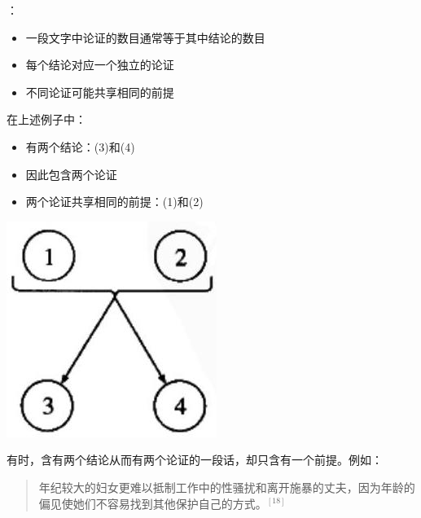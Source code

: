\begin{theorembox}[title=多重论证的识别原则]
：
\begin{itemize}
  \item 一段文字中论证的数目通常等于其中结论的数目
  \item 每个结论对应一个独立的论证
  \item 不同论证可能共享相同的前提
\end{itemize}

在上述例子中：
\begin{itemize}
  \item 有两个结论：(3)和(4)
  \item 因此包含两个论证
  \item 两个论证共享相同的前提：(1)和(2)
\end{itemize}
\end{theorembox}

\begin{center}
\includegraphics[width=\textwidth]{images/2025_05_15_6a28331d5e7c993ad07ag-032.jpg}
\end{center}

有时，含有两个结论从而有两个论证的一段话，却只含有一个前提。例如：

\begin{quotation}
年纪较大的妇女更难以抵制工作中的性骚扰和离开施暴的丈夫，因为年龄的偏见使她们不容易找到其他保护自己的方式。${}^{[18]}$
\end{quotation}

